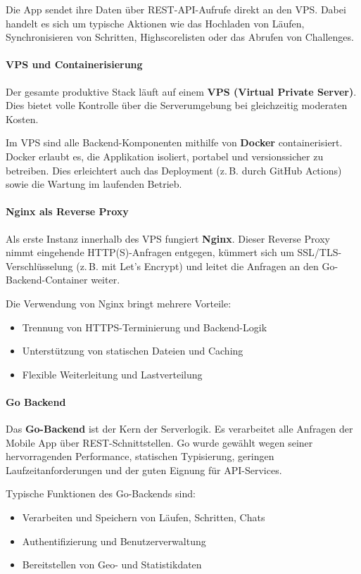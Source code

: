 \documentclass[11pt,a4paper]{article}
\begin{document}
Die App sendet ihre Daten  über REST-API-Aufrufe direkt an den VPS. Dabei handelt es sich um typische Aktionen wie das Hochladen von Läufen, Synchronisieren von Schritten, Highscorelisten oder das Abrufen von Challenges.

\paragraph{VPS und Containerisierung}
Der gesamte produktive Stack läuft auf einem \textbf{VPS (Virtual Private Server)}. Dies bietet volle Kontrolle über die Serverumgebung bei gleichzeitig moderaten Kosten.

Im VPS sind alle Backend-Komponenten mithilfe von \textbf{Docker} containerisiert. Docker erlaubt es, die Applikation isoliert, portabel und versionssicher zu betreiben. Dies erleichtert auch das Deployment (z.\,B. durch GitHub Actions\cite{github}) sowie die Wartung im laufenden Betrieb.

\paragraph{Nginx als Reverse Proxy}
Als erste Instanz innerhalb des VPS fungiert \textbf{Nginx}\cite{nginx}. Dieser Reverse Proxy nimmt eingehende HTTP(S)-Anfragen entgegen, kümmert sich um SSL/TLS-Verschlüsselung (z.\,B. mit Let's Encrypt) und leitet die Anfragen an den Go-Backend-Container weiter.

Die Verwendung von Nginx bringt mehrere Vorteile:
\begin{itemize}
    \item Trennung von HTTPS-Terminierung und Backend-Logik
    \item Unterstützung von statischen Dateien und Caching
    \item Flexible Weiterleitung und Lastverteilung
\end{itemize}

\paragraph{Go Backend}
Das \textbf{Go-Backend} ist der Kern der Serverlogik. Es verarbeitet alle Anfragen der Mobile App über REST-Schnittstellen. Go wurde gewählt wegen seiner hervorragenden Performance, statischen Typisierung, geringen Laufzeitanforderungen und der guten Eignung für API-Services.

Typische Funktionen des Go-Backends sind:
\begin{itemize}
    \item Verarbeiten und Speichern von Läufen, Schritten, Chats
    \item Authentifizierung und Benutzerverwaltung
    \item Bereitstellen von Geo- und Statistikdaten
\end{itemize}
\end{document}
